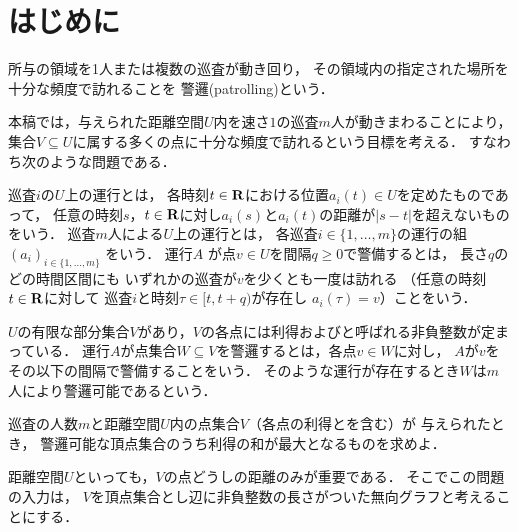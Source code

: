 
\section{はじめに}
所与の領域を1人または複数の巡査が動き回り，
その領域内の指定された場所を十分な頻度で訪れることを
警邏(patrolling)という\cite{chen2013fence, coene2011charlemagne, czyzowicz2011boundary}．


本稿では，与えられた距離空間$U$内を速さ$1$の巡査$m$人が動きまわることにより，
集合$V \subseteq U$に属する多くの点に十分な頻度で訪れるという目標を考える．
すなわち次のような問題である．

巡査$i$の$U$上の運行とは，
各時刻$t \in \mathbf R$における位置$a _i (t) \in U$を定めたものであって，
任意の時刻$s$，$t \in \mathbf R$に対し$a _i (s)$と$a _i (t)$の距離が$\lvert s - t \rvert$を超えないものをいう．
%
巡査$m$人による$U$上の運行とは，
各巡査$i \in \{1, \ldots, m\}$の運行の組
$(a _i) _{i \in \{1, \ldots, m\}}$
をいう．
%
%
運行$A$
が点$v \in U$を間隔$q \geq 0$で警備するとは，
長さ$q$のどの時間区間にも
いずれかの巡査が$v$を少くとも一度は訪れる
（任意の時刻$t \in \mathbf R$に対して
巡査$i$と時刻$\tau \in [t, t + q)$が存在し
$a _i (\tau) = v$）ことをいう．

$U$の有限な部分集合$V$があり，$V$の各点には利得および{\timelimit}と呼ばれる非負整数が定まっている．
運行$A$が点集合$W \subseteq V$を警邏するとは，各点$v \in W$に対し，
$A$が$v$をその{\timelimit}以下の間隔で警備することをいう．
そのような運行が存在するとき$W$は$m$人により警邏可能であるという．

\begin{cooperativepatrollingproblem}
    巡査の人数$m$と距離空間$U$内の点集合$V$（各点の利得と{\timelimit}を含む）が
    与えられたとき，
    警邏可能な頂点集合のうち利得の和が最大となるものを求めよ．
\end{cooperativepatrollingproblem}

距離空間$U$といっても，$V$の点どうしの距離のみが重要である．
そこでこの問題の入力は，
$V$を頂点集合とし辺に非負整数の長さがついた無向グラフと考えることにする．



